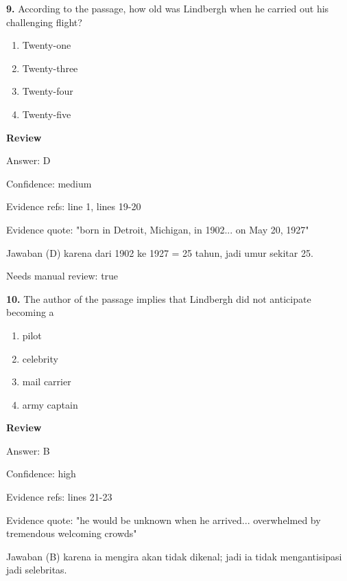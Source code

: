 \documentclass[12pt]{article}
\begin{document}
\endgroup
\par
\vspace{0.25\baselineskip}
\noindent\textbf{9.} According to the passage, how old was Lindbergh when he carried out his challenging flight?
\begin{enumerate}[label=(\Alph*),leftmargin=*,itemsep=0.2em]
\item Twenty-one
\item Twenty-three
\item Twenty-four
\item Twenty-five
\end{enumerate}
\par
\begingroup
\setlength{\parskip}{0pt}
\setlength{\parindent}{0pt}
\textbf{Review}\par
Answer: D\par
Confidence: medium\par
Evidence refs: line 1, lines 19-20\par
Evidence quote: "born in Detroit, Michigan, in 1902... on May 20, 1927"\par
Jawaban (D) karena dari 1902 ke 1927 = 25 tahun, jadi umur sekitar 25.\par
Needs manual review: true\par
\endgroup
\par
\vspace{0.25\baselineskip}
\noindent\textbf{10.} The author of the passage implies that Lindbergh did not anticipate becoming a
\begin{enumerate}[label=(\Alph*),leftmargin=*,itemsep=0.2em]
\item pilot
\item celebrity
\item mail carrier
\item army captain
\end{enumerate}
\par
\begingroup
\setlength{\parskip}{0pt}
\setlength{\parindent}{0pt}
\textbf{Review}\par
Answer: B\par
Confidence: high\par
Evidence refs: lines 21-23\par
Evidence quote: "he would be unknown when he arrived... overwhelmed by tremendous welcoming crowds"\par
Jawaban (B) karena ia mengira akan tidak dikenal; jadi ia tidak mengantisipasi jadi selebritas.\par
\endgroup
\par
\vspace{0.25\baselineskip}
\end{document}
